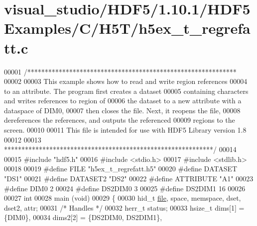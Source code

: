 \hypertarget{visual__studio_2_h_d_f5_21_810_81_2_h_d_f5_examples_2_c_2_h5_t_2h5ex__t__regrefatt_8c_source}{}\section{visual\+\_\+studio/\+H\+D\+F5/1.10.1/\+H\+D\+F5\+Examples/\+C/\+H5\+T/h5ex\+\_\+t\+\_\+regrefatt.c}
\label{visual__studio_2_h_d_f5_21_810_81_2_h_d_f5_examples_2_c_2_h5_t_2h5ex__t__regrefatt_8c_source}

\begin{DoxyCode}
00001 \textcolor{comment}{/************************************************************}
00002 \textcolor{comment}{}
00003 \textcolor{comment}{  This example shows how to read and write region references}
00004 \textcolor{comment}{  to an attribute.  The program first creates a dataset}
00005 \textcolor{comment}{  containing characters and writes references to region of}
00006 \textcolor{comment}{  the dataset to a new attribute with a dataspace of DIM0,}
00007 \textcolor{comment}{  then closes the file.  Next, it reopens the file,}
00008 \textcolor{comment}{  dereferences the references, and outputs the referenced}
00009 \textcolor{comment}{  regions to the screen.}
00010 \textcolor{comment}{}
00011 \textcolor{comment}{  This file is intended for use with HDF5 Library version 1.8}
00012 \textcolor{comment}{}
00013 \textcolor{comment}{ ************************************************************/}
00014 
00015 \textcolor{preprocessor}{#include "hdf5.h"}
00016 \textcolor{preprocessor}{#include <stdio.h>}
00017 \textcolor{preprocessor}{#include <stdlib.h>}
00018 
00019 \textcolor{preprocessor}{#define FILE            "h5ex\_t\_regrefatt.h5"}
00020 \textcolor{preprocessor}{#define DATASET         "DS1"}
00021 \textcolor{preprocessor}{#define DATASET2        "DS2"}
00022 \textcolor{preprocessor}{#define ATTRIBUTE       "A1"}
00023 \textcolor{preprocessor}{#define DIM0            2}
00024 \textcolor{preprocessor}{#define DS2DIM0         3}
00025 \textcolor{preprocessor}{#define DS2DIM1         16}
00026 
00027 \textcolor{keywordtype}{int}
00028 main (\textcolor{keywordtype}{void})
00029 \{
00030     hid\_t               \hyperlink{structfile}{file}, space, memspace, dset, dset2, attr;
00031                                                     \textcolor{comment}{/* Handles */}
00032     herr\_t              status;
00033     hsize\_t             dims[1] = \{DIM0\},
00034                         dims2[2] = \{DS2DIM0, DS2DIM1\},

\end{DoxyCode}
